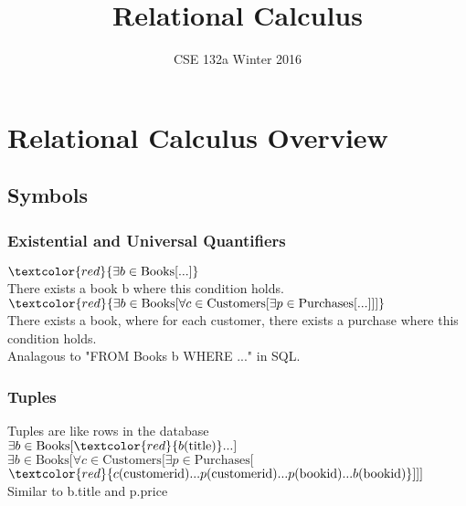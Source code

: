 \documentclass{beamer}
\begin{document}

\title{Relational Calculus}

\date[WI 2016]{CSE 132a Winter 2016}

\subject{Relational Calculus} %

\begin{frame}
  \titlepage
\end{frame}

\section{Relational Calculus Overview}

\subsection{Symbols}

\begin{frame}
  \frametitle{Existential and Universal Quantifiers}

  $\textcolor{red}{\exists b \in \text{Books} [...]}$\\
  There exists a book b where this condition holds.\\

  $\textcolor{red}{\exists b \in \text{Books} [\forall c \in \text{Customers} [ \exists p \in \text{Purchases} [...] ] ]}$\\
  There exists a book, where for each customer, there exists a purchase where this condition holds.\\

  Analagous to "FROM Books b WHERE ..." in SQL.
\end{frame}

\begin{frame}
  \frametitle{Tuples}

  Tuples are like rows in the database\\

  $\exists b \in \text{Books} [\textcolor{red}{b(\text{title})} ...]$\\

  $\exists b \in \text{Books} [\forall c \in \text{Customers} [ \exists p \in \text{Purchases} [ $
  $\textcolor{red}{c(\text{customerid}) ... p(\text{customerid}) ... p(\text{bookid}) ... b(\text{bookid})}] ] ]$\\

  Similar to b.title and p.price
\end{frame}
\end{document}

